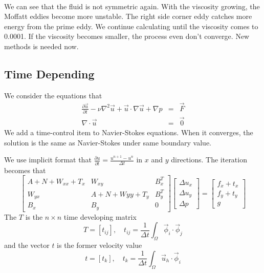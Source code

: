 \documentclass[a4paper]{article}
\begin{document}
\\
We can see that the fluid is not symmetric again. With the viscosity growing, the Moffatt eddies become more unstable. The right side corner eddy catches more energy from the prime eddy. We continue calculating until the viscosity comes to 0.0001. If the viscosity becomes smaller, the process even don't converge. New methods is needed now.
\subsection{Time Depending}
We consider the equations that
\begin{equation}
\begin{array}{rcl}
\frac{\partial\vec{u}}{\partial t}-\nu \nabla^2 \vec{u} + \vec{u}\cdot \nabla \vec{u} + \nabla p &=& \vec{F} \\
\nabla \cdot \vec{u} &=& \vec{0}
\label{eq::Timedepending-problem}
\end{array}
\end{equation}
We add a time-control item to Navier-Stokes equations. When it converges, the solution is the same as Navier-Stokes under same boundary value.


We use implicit format that $\frac{\partial u}{\partial t} = \frac{u^{n+1}-u^{n}}{\Delta t}$ in $x$ and $y$ directions.
The iteration becomes that
\begin{equation}
\left[ \begin{array}{ccc}
A + N +W_{xx} + T_x & W_{xy} & B_x^T \\
W_{yx} & A +N +W{yy} + T_y& B_y^T \\
B_x & B_y & 0
\end{array}
\right]
\left[\begin{array}{ccc}
\Delta u_x\\
\Delta u_y\\
\Delta p
\end{array}
\right]=
\left[\begin{array}{ccc}
f_x + t_x\\
f_y + t_y\\
g
\end{array}
\right]
\label{Timedepending}
\end{equation}
The $T$ is the $n\times n$ time developing matrix
\begin{equation}
T = [t_{ij}],\quad t_{ij}=\frac{1}{\Delta t}\int_{\Omega}\vec{\phi}_i\cdot\vec{\phi}_j
\end{equation}
and the vector $t$ is the former velocity value
\begin{equation}
t = [t_{k}],\quad t_{k}=\frac{1}{\Delta t}\int_{\Omega}\vec{u}_h\cdot\vec{\phi}_i
\end{equation}
\\
\end{document}
